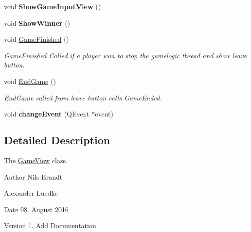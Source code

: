 \begin{DoxyCompactItemize}
\item 
\hypertarget{classGameView_a92b306e86ed8fe682763050be4edf254}{void {\bfseries Show\-Game\-Input\-View} ()}\label{classGameView_a92b306e86ed8fe682763050be4edf254}

\item 
\hypertarget{classGameView_a29cba4e6e6963b659f3cb2acbdfc3fe1}{void {\bfseries Show\-Winner} ()}\label{classGameView_a29cba4e6e6963b659f3cb2acbdfc3fe1}

\item 
\hypertarget{classGameView_a3e06ec8f766005c4aac0d572559fc9ed}{void \hyperlink{classGameView_a3e06ec8f766005c4aac0d572559fc9ed}{Game\-Finished} ()}\label{classGameView_a3e06ec8f766005c4aac0d572559fc9ed}

\begin{DoxyCompactList}\small\item\em Game\-Finished Called if a player won to stop the gamelogic thread and show leave button. \end{DoxyCompactList}\item 
\hypertarget{classGameView_a157ac747504394587761ac30a79b9597}{void \hyperlink{classGameView_a157ac747504394587761ac30a79b9597}{End\-Game} ()}\label{classGameView_a157ac747504394587761ac30a79b9597}

\begin{DoxyCompactList}\small\item\em End\-Game called from leave button calls Game\-Ended. \end{DoxyCompactList}\item 
\hypertarget{classGameView_a5d6aac6e502ec51285f03ba51da00886}{void {\bfseries change\-Event} (Q\-Event $\ast$event)}\label{classGameView_a5d6aac6e502ec51285f03ba51da00886}

\end{DoxyCompactItemize}


\subsection{Detailed Description}
The \hyperlink{classGameView}{Game\-View} class. 

\begin{DoxyAuthor}{Author}
Nils Brandt 

Alexander Luedke
\end{DoxyAuthor}
\begin{DoxyDate}{Date}
08. August 2016
\end{DoxyDate}
\begin{DoxyVersion}{Version}
1. Add Documentation 
\end{DoxyVersion}


